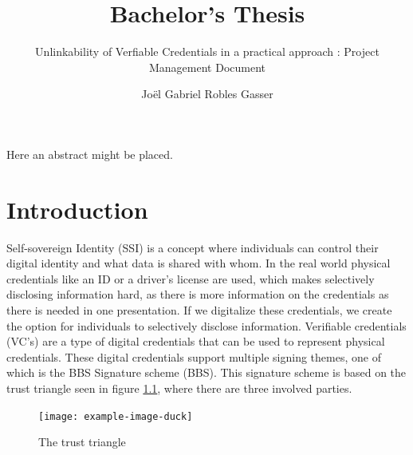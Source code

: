 \documentclass[
	a4paper               %
	,bibliography=totoc   %
	,listof=totoc         %
	,monolingual
	twoside=false,
]{bfhthesis}              %
\begin{document}
\frontmatter

\title{Bachelor's Thesis}
\subtitle{Unlinkability of Verfiable Credentials in a practical approach
: Project Management Document}
\author{Joël Gabriel Robles Gasser}

\maketitle

Here an abstract might be placed.


\tableofcontents

\mainmatter

\chapter{Introduction}
Self-sovereign Identity (SSI)\cite{self-sovereign-identity} is a concept where individuals can control their digital identity and what data is shared with whom.
In the real world physical credentials like an ID or a driver's license are used, which makes selectively disclosing information hard, as there is more information on the credentials as there is needed in one presentation.
If we digitalize these credentials, we create the option for individuals to selectively disclose information. 
Verifiable credentials (VC's)\cite{verifiable-credentials} are a type of digital credentials that can be used to represent physical credentials.
These digital credentials support multiple signing themes, one of which is the BBS Signature scheme (BBS)\cite{bbs-signature-scheme}.
This signature scheme is based on the trust triangle seen in figure \ref{fig:trusttringle}, where there are three involved parties.

\begin{figure}[h]
	\centering
	\texttt{[image: example-image-duck]}
	\caption{The trust triangle}
	\label{fig:trusttringle}
\end{figure}
\end{document}
